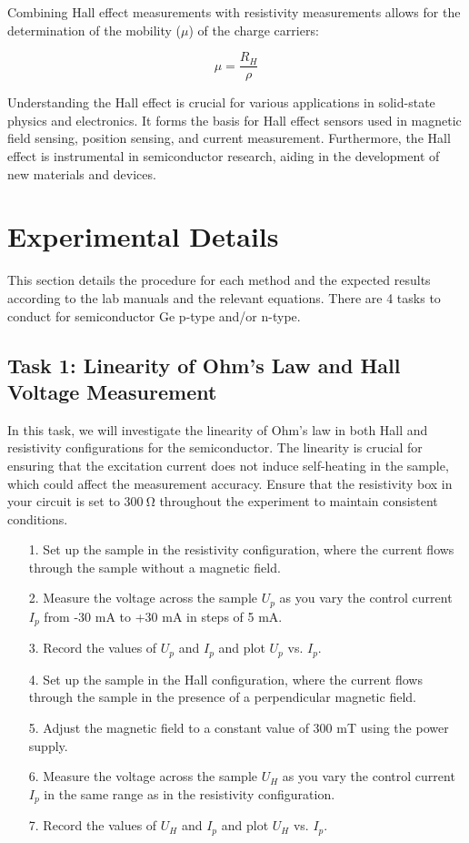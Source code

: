 \documentclass[11pt]{article}
\begin{document}
	Combining Hall effect measurements with resistivity measurements allows for the determination of the mobility (\(\mu\)) of the charge carriers:
	
	\begin{equation}
		\mu = \frac{R_H}{\rho} \label{eq:6}
	\end{equation}
	
	Understanding the Hall effect is crucial for various applications in solid-state physics and electronics. It forms the basis for Hall effect sensors used in magnetic field sensing, position sensing, and current measurement. Furthermore, the Hall effect is instrumental in semiconductor research, aiding in the development of new materials and devices.
	
	
	\clearpage
	
	\section{Experimental Details}
	
	This section details the procedure for each method and the expected results according to the lab manuals and the relevant equations. There are 4 tasks to conduct for semiconductor Ge p-type and/or n-type.
	
	\subsection{Task 1: Linearity of Ohm's Law and Hall Voltage Measurement}
	
	In this task, we will investigate the linearity of Ohm's law in both Hall and resistivity configurations for the semiconductor. The linearity is crucial for ensuring that the excitation current does not induce self-heating in the sample, which could affect the measurement accuracy. Ensure that the resistivity box in your circuit is set to $\qty{300}{\ohm}$ throughout the experiment to maintain consistent conditions.
	
	\begin{enumerate}
		\item[1.] Set up the sample in the resistivity configuration, where the current flows through the sample without a magnetic field.
		\item[2.] Measure the voltage across the sample \(U_p\) as you vary the control current \(I_p\) from -30 mA to +30 mA in steps of 5 mA.
		\item[3.] Record the values of \(U_p\) and \(I_p\) and plot \(U_p\) vs. \(I_p\).
		\item[4.] Set up the sample in the Hall configuration, where the current flows through the sample in the presence of a perpendicular magnetic field.
		\item[5.] Adjust the magnetic field to a constant value of 300 mT using the power supply.
		\item[6.] Measure the voltage across the sample \(U_H\) as you vary the control current \(I_p\) in the same range as in the resistivity configuration.
		\item[7.] Record the values of \(U_H\) and \(I_p\) and plot \(U_H\) vs. \(I_p\).
	\end{enumerate}
	
\end{document}
